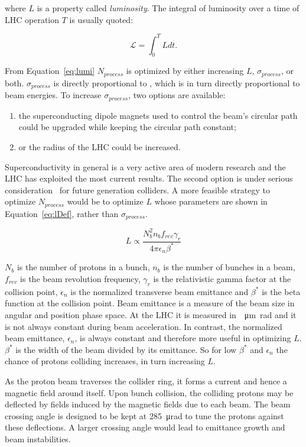 where $L$ is a property called {\it luminosity}. The integral of luminosity over a time 
of LHC operation $T$ is usually quoted: 

\begin{equation}
\mathcal{L} = \int_0^{T} L dt. 
\label{eq:intL}
\end{equation}

From Equation~\ref{eq:lumi} $N_{process}$ is optimized by either increasing $L$, $\sigma_{process}$, 
or both. $\sigma_{process}$ is directly proportional to \sqs, which is in turn directly proportional to
 beam energies. To increase $\sigma_{process}$, two options are available:
\begin{enumerate} 
\item the superconducting dipole magnets used to control the beam's circular path could 
be upgraded while keeping the circular path constant;
\item or the radius of the LHC could be increased.
\end{enumerate}
 Superconductivity in general is a very 
active area of modern research and the LHC has exploited the most current results. 
 The second option is under serious consideration~\cite{Arkani-Hamed:2015vfh} 
for future generation colliders. A more feasible strategy to optimize $N_{process}$ 
would be to optimize $L$ whose parameters are shown in Equation~\ref{eq:lDef}, rather than $\sigma_{process}$.  

\begin{equation}
L \propto \frac{N^2_bn_bf_{rev}\gamma_r}{4\pi\epsilon_n\beta^*}
\label{eq:lDef}
\end{equation} 

$N_b$ is the number of protons in a bunch, $n_b$ is the number of bunches in a beam, 
$f_{rev}$ is the beam revolution frequency, $\gamma_r$ is the relativistic gamma factor at the 
collision point, $\epsilon_n$ is the normalized transverse beam emittance and $\beta^*$ 
is the beta function at the collision point.
Beam emittance is a measure of the beam size in angular and position phase space. At the LHC
it is measured in~\SI{}{\um\radian} and it is not always constant during beam acceleration. 
In contrast, the normalized beam emittance, $\epsilon_n$, is always constant and therefore 
more useful in optimizing $L$. $\beta^*$ is the width of the beam divided by its emittance. 
So for low $\beta^*$ and $\epsilon_n$ the chance of protons colliding increases, in turn increasing $L$.  

\par As the proton beam traverses the collider ring, it forms a current and hence a magnetic field 
around itself. Upon bunch collision, the colliding protons may be deflected by fields induced 
by the magnetic fields due to each beam. The beam crossing angle is designed to be kept at 
\SI{285}{\micro\radian} to tune the protons against these deflections. A larger crossing 
angle would lead to emittance growth and beam instabilities. 

